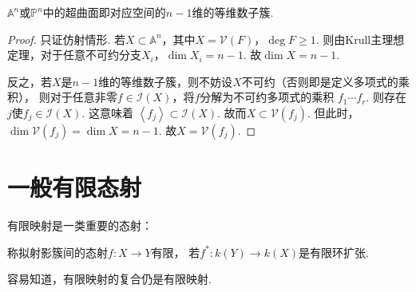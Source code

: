     \begin{corollary}
        $\mathbb{A}^{n}$或$\mathbb{P}^{n}$中的超曲面即对应空间的$n-1$维的等维数子簇.
    \end{corollary}
    \begin{proof}
        只证仿射情形. 
        若$X \subset \mathbb{A}^{n}$，其中$X=\mathcal{V}(F)$，$\deg F \geq 1$.
        则由Krull主理想定理，对于任意不可约分支$X_{i}$，$\dim X_{i} = n - 1$. 
        故$\dim X = n - 1$. \par
        反之，若$X$是$n-1$维的等维数子簇，则不妨设$X$不可约（否则即是定义多项式的乘积），
        则对于任意非零$f \in \mathcal{I}(X)$，将$f$分解为不可约多项式的乘积
        $f_{1}\cdots f_{r}$. 则存在$j$使$f_{j} \in \mathcal{I}(X)$. 这意味着
        $\left< f_{j} \right> \subset \mathcal{I}(X)$. 
        故而$X \subset \mathcal{V}(f_{j})$. 
        但此时，$\dim \mathcal{V}(f_{j}) = \dim X = n - 1$. 
        故$X = \mathcal{V}(f_{j})$.
    \end{proof}


\section{一般有限态射}
    有限映射是一类重要的态射：
    \begin{definition}
        称拟射影簇间的态射$f\colon X \rightarrow Y$有限，
        若$f^{*}\colon k(Y) \rightarrow k(X)$是有限环扩张.
    \end{definition}

    容易知道，有限映射的复合仍是有限映射.
    
